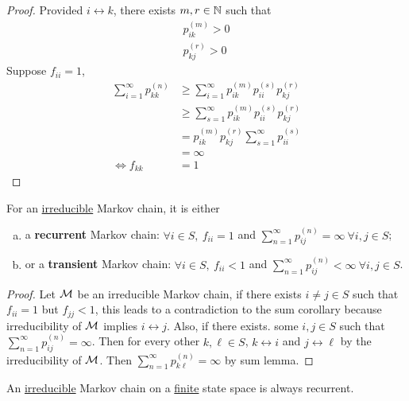 \documentclass{article}
\newcommand{\upn}[0]{^{(n)}}
\begin{document}
    \begin{proof}
    	Provided $i \leftrightarrow k$, there exists $m, r \in \mathbb{N}$ such that 
    	\begin{align}
    		p_{ik}^{(m)} > 0 \\
    		p_{kj}^{(r)} > 0
    	\end{align}
    	Suppose $f_{ii} = 1$, 
    	\begin{align}
    		\sum_{i=1}^\infty p_{kk}\upn 
    		&\geq \sum_{i=1}^\infty p_{ik}^{(m)} p_{ii}^{(s)} p_{kj}^{(r)} \\
    		&\geq \sum_{s=1}^\infty p_{ik}^{(m)} p_{ii}^{(s)} p_{kj}^{(r)} \\
    		&= p_{ik}^{(m)} p_{kj}^{(r)} \sum_{s=1}^\infty p_{ii}^{(s)} \\
    		&= \infty \\
    		\iff f_{kk} &= 1
    	\end{align}
    \end{proof}
    
    \begin{theorem}
    	For an \ul{irreducible} Markov chain, it is either
    	\begin{enumerate}[(a)]
    		\item a \textbf{recurrent} Markov chain: $\forall i \in S,\ f_{ii} = 1$ and  $\sum_{n=1}^\infty p_{ij}\upn = \infty\ \forall i, j \in S$;
    		\item or a \textbf{transient} Markov chain: $\forall i \in S,\ f_{ii} < 1$ and $\sum_{n=1}^\infty p_{ij}\upn < \infty\ \forall i, j \in S$.
    	\end{enumerate}
    \end{theorem}

    \begin{proof}
    	Let $\mathcal{{M}}$ be an irreducible Markov chain, if there exists $i \neq j \in S$ such that $f_{ii} = 1$ but $f_{jj} < 1$, this leads to a contradiction to the sum corollary because irreducibility of $\mathcal{{M}}$ implies $i \leftrightarrow j$. Also, if there exists. some $i, j \in S$ such that $\sum_{n=1}^\infty p_{ij}\upn = \infty$. Then for every other $k, \ell \in S$, $k \leftrightarrow i$ and $j \leftrightarrow \ell$ by the irreducibility of $\mathcal{{M}}$. Then $\sum_{n=1}^\infty p_{k \ell}\upn = \infty$ by sum lemma.
    \end{proof}
    
    \begin{theorem}
    	An \ul{irreducible} Markov chain on a \ul{finite} state space is always recurrent.
    \end{theorem}
    
\end{document}
